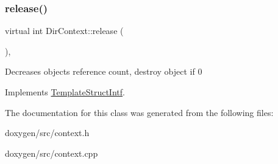 \subsubsection{\texorpdfstring{release()}{release()}}
{\footnotesize\ttfamily virtual int Dir\+Context\+::release (\begin{DoxyParamCaption}{ }\end{DoxyParamCaption})\hspace{0.3cm}{\ttfamily [inline]}, {\ttfamily [virtual]}}

Decreases object\textquotesingle{}s reference count, destroy object if 0 

Implements \mbox{\hyperlink{class_template_struct_intf_a3dce7dd29d3f66a8080b40578e8a5045}{Template\+Struct\+Intf}}.



The documentation for this class was generated from the following files\+:\begin{DoxyCompactItemize}
\item 
doxygen/src/context.\+h\item 
doxygen/src/context.\+cpp\end{DoxyCompactItemize}
